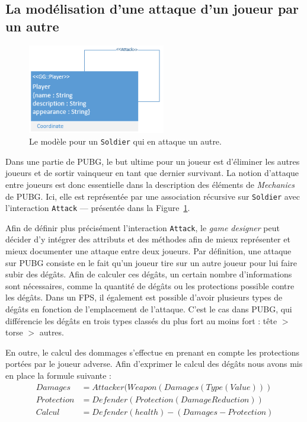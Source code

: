 \subsection{La modélisation d'une attaque d'un joueur par un autre}
\label{sect.attack}

\begin{figure}
    \centering
    \includegraphics[width=6cm]{10_img/chap6/attack_min.PNG}
    \caption{Le mod\`ele pour un \texttt{Soldier} qui en attaque un autre.}
    \label{fig.PUBG_attack_min}
\end{figure}

Dans une partie de PUBG, le but ultime pour un joueur est d'éliminer les autres joueurs et de sortir vainqueur en tant que dernier survivant. La notion d'attaque entre joueurs est donc essentielle dans la description des éléments de \emph{Mechanics} de PUBG. Ici, elle est représentée par une association récursive sur \texttt{Soldier} avec l'interaction \texttt{Attack} --- présentée dans la Figure~\ref{fig.PUBG_attack_min}. 

Afin de définir plus précisément l'interaction \texttt{Attack}, le \emph{game designer} peut décider d'y intégrer des attributs et des méthodes afin de mieux représenter et mieux documenter une attaque entre deux joueurs. Par définition, une attaque sur PUBG consiste en le fait qu'un joueur tire sur un autre joueur pour lui faire subir des dégâts.
%
Afin de calculer ces dégâts, un certain nombre d'informations sont n\'ecessaires, comme la quantité de dégâts ou les protections possible contre les dégâts.
Dans un FPS, il également est possible d'avoir plusieurs types de dégâts en fonction de l'emplacement de l'attaque.
C'est le cas dans PUBG, qui différencie les dégâts en trois types classés du plus fort au moins fort : tête $>$ torse $>$ autres.

\begin{samepage}
En outre, le calcul des dommages s'effectue en prenant en compte les protections portées par le joueur adverse.
Afin d'exprimer le calcul des dégâts nous avons mis en place la formule suivante :
%
\begin{equation*}
\begin{split}
Damages& = Attacker(Weapon(Damages(Type(Value)))\\
Protection& = Defender(Protection(DamageReduction))\\
Calcul& = Defender(health) - (Damages - Protection)
\end{split}
\end{equation*}

\end{samepage}

